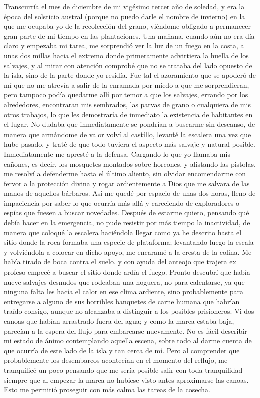 \documentclass{novela}
\begin{document}
    Transcurría el mes de diciembre de mi vigésimo tercer año de soledad, y era la época del solsticio austral (porque no puedo darle el nombre de invierno) en la que me ocupaba yo de la recolección del grano, viéndome obligado a permanecer gran parte de mi tiempo en las plantaciones. Una mañana, cuando aún no era día claro y empezaba mi tarea, me sorprendió ver la luz de un fuego en la costa, a unas dos millas hacia el extremo donde primeramente advirtiera la huella de los salvajes, y al mirar con atención comprobé que no se trataba del lado opuesto de la isla, sino de la parte donde yo residía.
    Fue tal el azoramiento que se apoderó de mí que no me atrevía a salir de la enramada por miedo a que me sorprendieran, pero tampoco podía quedarme allí por temor a que los salvajes, errando por los alrededores, encontraran mis sembrados, las parvas de grano o cualquiera de mis otros trabajos, lo que les demostraría de inmediato la existencia de habitantes en el lugar. No dudaba que inmediatamente se pondrían a buscarme sin descanso, de manera que armándome de valor volví al castillo, levanté la escalera una vez que hube pasado, y traté de que todo tuviera el aspecto más salvaje y natural posible.
    Inmediatamente me apresté a la defensa. Cargando lo que yo llamaba mis cañones, es decir, los mosquetes montados sobre horcones, y alistando las pistolas, me resolví a defenderme hasta el último aliento, sin olvidar encomendarme con fervor a la protección divina y rogar ardientemente a Dios que me salvara de las manos de aquellos bárbaros. Así me quedé por espacio de unas dos horas, lleno de impaciencia por saber lo que ocurría más allá y careciendo de exploradores o espías que fuesen a buscar novedades.
    Después de estarme quieto, pensando qué debía hacer en la emergencia, no pude resistir por más tiempo la inactividad, de manera que coloqué la escalera haciéndola llegar como ya he descrito hasta el sitio donde la roca formaba una especie de plataforma; levantando luego la escala y volviéndola a colocar en dicho apoyo, me encaramé a la cresta de la colina. Me había tirado de boca contra el suelo, y con ayuda del anteojo que trajera ex profeso empecé a buscar el sitio donde ardía el fuego. Pronto descubrí que había nueve salvajes desnudos que rodeaban una hoguera, no para calentarse, ya que ninguna falta les hacía el calor en ese clima ardiente, sino probablemente para entregarse a alguno de sus horribles banquetes de carne humana que habrían traído consigo, aunque no alcanzaba a distinguir a los posibles prisioneros.
    Vi dos canoas que habían arrastrado fuera del agua; y como la marea estaba baja, parecían a la espera del flujo para embarcarse nuevamente. No es fácil describir mi estado de ánimo contemplando aquella escena, sobre todo al darme cuenta de que ocurría de este lado de la isla y tan cerca de mí. Pero al comprender que probablemente los desembarcos acontecían en el momento del reflujo, me tranquilicé un poco pensando que me sería posible salir con toda tranquilidad siempre que al empezar la marea no hubiese visto antes aproximarse las canoas. Esto me permitió proseguir con más calma las tareas de la cosecha.
\end{document}
